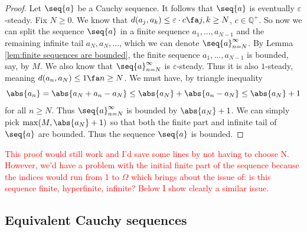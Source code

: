 { \label{lem:Cauchy sequences are bounded}
\begin{proof}
    Let $\seq{a}$ be a Cauchy sequence. It follows that $\seq{a}$ is eventually $\varepsilon$-steady. Fix $N \geq 0$. We know that $d(a_j, a_k)\leq \varepsilon \cdot c \fa j,k \geq N$, $c \in \mathbb{Q}^{+}$. So now we can split the sequence $\seq{a}$ in a finite sequence $a_1, ..., a_{N-1}$ and the remaining infinite tail $a_N, a_{N}, ...$, which we can denote $\seq{a}_{n=N}^\infty$. By Lemma \ref{lem:finite sequences are bounded}, the finite sequence $a_1, ..., a_{N-1}$ is bounded, say, by $M$. We also know that $\seq{a}_{n=N}^\infty$ is $\varepsilon$-steady. Thus it is also $1$-steady, meaning $d(a_n, a_N) \leq 1 \fa n \geq N$. We must have, by triangle inequality
    \begin{equation*}
        \abs{a_n} = \abs{a_N+a_n-a_N} \leq \abs{a_N} + \abs{a_n-a_N} \leq \abs{a_N} +1
    \end{equation*}
    for all $n \geq N$. Thus $\seq{a}_{n=N}^\infty$ is bounded by $\abs{a_N} +1$. We can simply pick $\max(M, \abs{a_N} +1)$ so that both the finite part and infinite tail of $\seq{a}$ are bounded. Thus the sequence $\seq{a}$ is bounded. 
\end{proof}
\textcolor{red}{This proof would still work and I'd save some lines by not having to choose N. However, we'd have a problem with the initial finite part of the sequence because the indices would run from 1 to $\Omega$ which brings about the issue of: is this sequence finite, hyperfinite, infinite? Below I show clearly a similar issue.}

\subsection{Equivalent Cauchy sequences}

}
